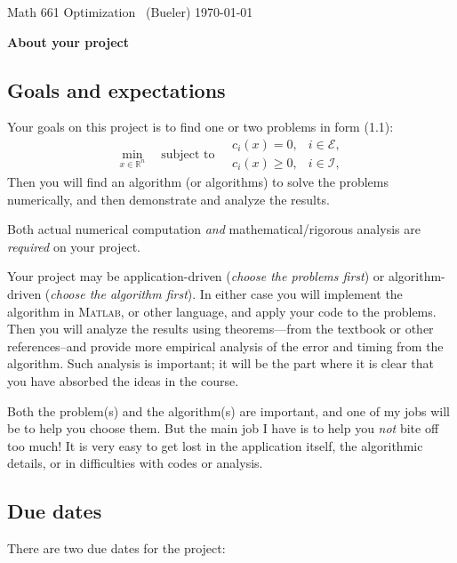 \documentclass[12pt]{amsart}
\newcommand{\normalspacing}{\renewcommand{\baselinestretch}{1.05}
        \tiny\normalsize}
\newcommand{\RR}{\mathbb{R}}
\newcommand{\Matlab}{\textsc{Matlab}\xspace}
\begin{document}
\scriptsize \phantom{bob} \vspace{-0.3in}
\noindent Math 661 Optimization \, (Bueler) \hfill  \today
\normalsize\bigskip
\normalspacing

\Large\centerline{\textbf{About your project}}
\normalsize

\bigskip\medskip
\thispagestyle{empty}
\normalspacing

\subsection*{Goals and expectations} Your goals on this project is to find one or two problems in form (1.1):
    $$\min_{x\in \RR^n} \quad \text{subject to} \quad \begin{matrix}
                                                      c_i(x) = 0, & i \in \mathcal{E}, \\
                                                      c_i(x) \ge 0, & i \in \mathcal{I},
                                                      \end{matrix}$$
Then you will find an algorithm (or algorithms) to solve the problems numerically, and then demonstrate and analyze the results.

Both actual numerical computation \emph{and} mathematical/rigorous analysis are \emph{required} on your project.

Your project may be application-driven (\emph{choose the problems first}) or algorithm-driven (\emph{choose the algorithm first}).  In either case you will implement the algorithm in \Matlab, or other language, and apply your code to the problems.  Then you will analyze the results using theorems---from the textbook or other references--and provide more empirical analysis of the error and timing from the algorithm.  Such analysis is important; it will be the part where it is clear that you have absorbed the ideas in the course.

Both the problem(s) and the algorithm(s) are important, and one of my jobs will be to help you choose them.  But the main job I have is to help you \emph{not} bite off too much!  It is very easy to get lost in the application itself, the algorithmic details, or in difficulties with codes or analysis.


\subsection*{Due dates} There are two due dates for the project:
\end{document}
